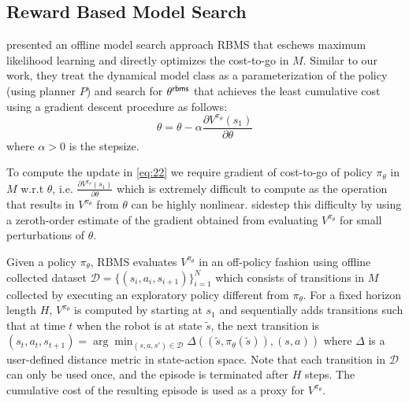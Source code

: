 \subsection{Reward Based Model Search}
\label{sec:reward-based-model}

\cite{DBLP:conf/icra/JosephGRHR13} presented an offline model search
approach RBMS that eschews maximum likelihood learning and directly
optimizes the cost-to-go in $M$. Similar to our work, they treat the
dynamical model class as a parameterization of the policy (using
planner $P$) and search for $\theta^{\mathsf{rbms}}$ that achieves the least
cumulative cost using a gradient descent procedure as follows:
\begin{equation}
  \label{eq:22}
  \theta = \theta - \alpha \frac{\partial
    V^{\pi_{\theta}}(s_1)}{\partial {\theta}}
\end{equation}
where $\alpha > 0$ is the stepsize.

To compute the update in \eqref{eq:22} we require gradient of
cost-to-go of policy $\pi_{\theta}$ in $M$ w.r.t ${\theta}$,
i.e. $\frac{\partial
    V^{\pi_{\theta}}(s_1)}{\partial {\theta}}$ which is
  extremely difficult to compute as the operation that results in
  $V^{\pi_{\theta}}$ from ${\theta}$ can be highly
  nonlinear. \cite{DBLP:conf/icra/JosephGRHR13} sidestep this
  difficulty by using a zeroth-order estimate of the gradient obtained
  from evaluating $V^{\pi_{\theta}}$ for small perturbations of
  ${\theta}$.

  Given a policy $\pi_{{\theta}}$, RBMS evaluates $V^{\pi_{\theta}}$
  in an off-policy fashion using offline collected dataset
  $\mathcal{D} = \{(s_i, a_i, s_{i+1})\}_{i=1}^N$ which consists
  of transitions in $M$ collected by executing an exploratory policy
  different from $\pi_\theta$. For a fixed horizon length $H$,
  $V^{\pi_\theta}$ is computed by starting at $s_1$ and sequentially
  adds transitions such that at time $t$ when the robot is at state
  $\tilde{s}$, the next transition is $(s_t, a_t, s_{t+1}) =
  \arg\min_{(s, a, s') \in \mathcal{D}} \Delta((\tilde{s},
  \pi_\theta(\tilde{s})), (s, a))$ where $\Delta$ is a user-defined
  distance metric in state-action space. Note that each transition in
  $\mathcal{D}$ can only be used once, and the episode is terminated
  after $H$ steps. The cumulative cost of the resulting episode is
  used as a proxy for $V^{\pi_\theta}$.


